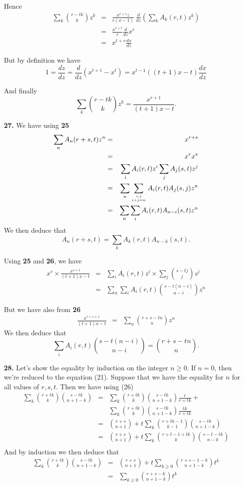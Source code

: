 \documentclass[a4paper,12pt]{article}
\newcommand{\newpar}[1]{\bigskip \noindent \textbf{#1.}}
\begin{document}
Hence
\begin{eqnarray*}
  \sum_k {{r-tk} \choose k} z^k &=& \frac{x^{r+1}z}{r(x-1)}\ \frac{d}{dz}
  \left( \sum_k A_k(r,t) z^k\right) \\
  &=& \frac{x^{1+t}}{r} \frac{d}{dz} x^r \\
  &=& x^{t+r} \frac{dx}{dz}
\end{eqnarray*}

But by definition we have
\[  1 = \frac{dz}{dz} = \frac{d}{dz}(x^{t+1}-x^t) = x^{t-1}((t+1)x - t)
\frac{dx}{dz} \]

And finally
\[ \sum_k {{r-tk} \choose k} z^k = \frac{x^{r+1}}{(t+1)x - t} .\]

\newpar{27} We have using \textbf{25}
\begin{eqnarray*}
  \sum_n A_n(r+s, t) z^n &=& x^{r+s} \\
  &=& x^r x^s \\
  &=& \sum_i A_i(r, t) z^i \sum_j A_j(s, t) z^j \\
  &=& \sum_n \sum_{i,j \atop i+j=n} A_i(r,t) A_j(s,j) z^n \\
  &=& \sum_n \sum_i A_i(r,t) A_{n-i}(s,t)z^n
\end{eqnarray*}
We then deduce that
\[ A_n(r+s,t) = \sum_k A_k(r,t) A_{n-k}(s,t).\]

Using \textbf{25} and \textbf{26}, we have
\begin{eqnarray*}
  x^r \times \frac{x^{s+1}}{(t+1)x-t} &=& \sum_i A_i(r,t) z^i \times
  \sum_j {{s-tj} \choose j} z^j \\
  &=& \sum_n \sum_i A_i(r,t) {{s-t(n-i)} \choose {n-i}} z^n
\end{eqnarray*}

But we have also from \textbf{26}
\begin{eqnarray*}
  \frac{x^{r+s+1}}{(t+1)x-t} &=& \sum_n {{r+s-tn} \choose n} z^n
\end{eqnarray*}
We then deduce that
\[ \sum_i A_i(r,t) {{s-t(n-i)} \choose {n-i}} = {{r+s-tn} \choose n}.\]

\newpar{28}  Let's show the equality by induction on the integer $n
\ge 0$.  If $n=0$, then we're reduced to the equation (21).  Suppose
that we have the equality for $n$ for all values of $r,s,t$.  Then we
have using (26)
\begin{eqnarray*}
  \sum_k {r+tk \choose k}{s-tk\choose n+1-k} &=&
  \sum_k {r+tk \choose k}{s-tk\choose n+1-k}\frac{r}{r+tk} +\\
  && \sum_k {r+tk \choose k}{s-tk\choose n+1-k}\frac{tk}{r+tk} \\
  &=& {r + s \choose n+1} + t \sum_k {r+tk-1 \choose k-1}{s-tk \choose
    n+1-k} \\
  &=& {r+s \choose n+1} + t \sum_k {r+t-1 + tk \choose k}{s-t-tk
    \choose n-k} \\
\end{eqnarray*}
And by induction we then deduce that
\begin{eqnarray*}
\sum_k {r+tk \choose k}{s-tk\choose n+1-k}  &=& {r+s \choose n+1} + t
\sum_{k\ge 0} {r+s-1-k\choose n+1-k} t^k \\
&=& \sum_{k\ge 0} {r+s-k \choose n+1-k} t^k
\end{eqnarray*}
\end{document}
